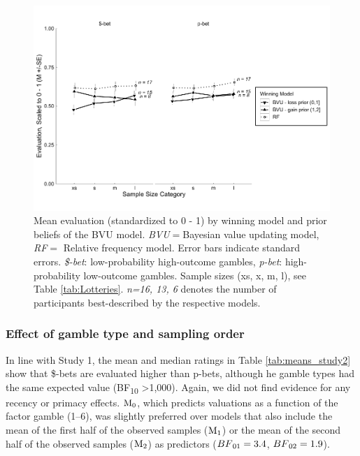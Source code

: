 \documentclass[a4paper, man, floatsintext]{apa6}
\begin{document}
\begin{figure}[htb]

{\centering \includegraphics{../figures/qual2-1} 

}

\caption{Mean evaluation (standardized to 0 - 1) by winning model and prior beliefs of the BVU model. \textit{BVU}$=$Bayesian value updating model, \textit{RF}$=$ Relative frequency model. Error bars indicate standard errors. \textit{\$-bet}: low-probability high-outcome gambles, \textit{p-bet}: high-probability low-outcome gambles. Sample sizes (xs, x, m, l), see Table \ref{tab:Lotteries}. \textit{n=16, 13, 6} denotes the number of participants best-described by the respective models.}\label{fig:qual2}
\end{figure}

\subsubsection{Effect of gamble type and sampling order}

In line with Study 1, the mean and median ratings in Table
\ref{tab:means_study2} show that \$-bets are evaluated higher than
p-bets, although he gamble types had the same expected value
(BF\textsubscript{10} \textgreater 1,000). Again, we did not find
evidence for any recency or primacy effects.
\(\mathrm{M}\textsubscript{0}\), which predicts valuations as a function
of the factor gamble (1--6), was slightly preferred over models that
also include the mean of the first half of the observed samples
(\(\mathrm{M}\textsubscript{1}\)) or the mean of the second half of the
observed samples (\(\mathrm{M}\textsubscript{2}\)) as predictors
(\(BF\textsubscript{01} = 3.4\), \(BF\textsubscript{02} = 1.9\)).
\end{document}
